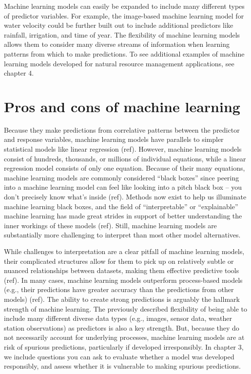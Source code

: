 \documentclass[
]{book}
\begin{document}
Machine learning models can easily be expanded to include many different types of predictor variables. For example, the image-based machine learning model for water velocity could be further built out to include additional predictors like rainfall, irrigation, and time of year. The flexibility of machine learning models allows them to consider many diverse streams of information when learning patterns from which to make predictions. To see additional examples of machine learning models developed for natural resource management applications, see chapter 4.

\hypertarget{pros-and-cons-of-machine-learning}{%
\section{Pros and cons of machine learning}\label{pros-and-cons-of-machine-learning}}

Because they make predictions from correlative patterns between the predictor and response variables, machine learning models have parallels to simpler statistical models like linear regression (ref). However, machine learning models consist of hundreds, thousands, or millions of individual equations, while a linear regression model consists of only one equation. Because of their many equations, machine learning models are commonly considered ``black boxes'' since peering into a machine learning model can feel like looking into a pitch black box -- you don't precisely know what's inside (ref). Methods now exist to help us illuminate machine learning black boxes, and the field of ``interpretable'' or ``explainable'' machine learning has made great strides in support of better understanding the inner workings of these models (ref). Still, machine learning models are substantially more challenging to interpret than most other model alternatives.

While challenges to interpretation are a clear pitfall of machine learning models, their complicated structures allow for them to pick up on relatively subtle or nuanced relationships between datasets, making them effective predictive tools (ref). In many cases, machine learning models outperform process-based models (e.g., their predictions have greater accuracy than the predictions from other models) (ref). The ability to create strong predictions is arguably the hallmark strength of machine learning. The previously described flexibility of being able to include many different diverse data types (e.g., images, sensor data, weather station observations) as predictors is also a key strength. But, because they do not necessarily account for underlying processes, machine learning models are at risk of spurious predictions, particularly if developed irresponsibly. In chapter 3, we include questions you can ask to evaluate whether a model was developed responsibly, and assess whether it is vulnerable to making spurious predictions.
\end{document}
